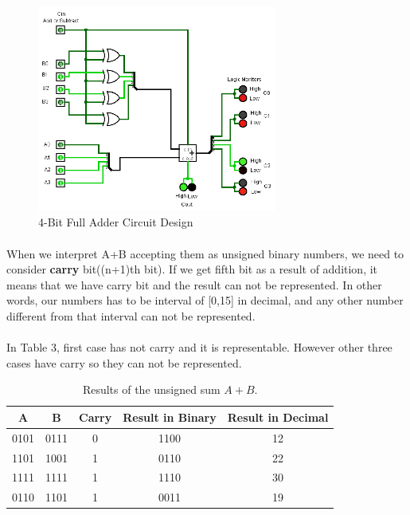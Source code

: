 \documentclass[pdftex,12pt,a4paper]{article}
\begin{document}
\begin{figure}[!h]
	\centering
	\includegraphics[width=0.7\textwidth]{part3.png}	
	\caption{4-Bit Full Adder Circuit Design}
	\label{4-Bit Full Adder}
\end{figure}
\clearpage
\paragraph{}
When we interpret A+B accepting them as unsigned binary numbers, we need to consider \textbf{carry} bit((n+1)th bit). If we get fifth bit as a result of addition, it means that we have carry bit and the result can not be represented. In other words, our numbers has to be interval of [0,15] in decimal, and any other number different from that interval can not be represented.
\paragraph{}
In Table 3, first case has not carry and it is representable. However other three cases have carry so they can not be represented. \newline
\begin{table}[!h]
\begin{center}
    \begin{tabular}{|c|c|c|c|c|}
    \hline
         A & B & Carry & Result in Binary & Result in Decimal \\
         \hline
         0101 & 0111 & 0 & 1100 & 12 \\
         \hline
         1101 & 1001 & 1 & 0110 & 22  \\
         \hline
         1111 & 1111 & 1 & 1110 & 30 \\
         \hline
         0110 & 1101 & 1 & 0011 & 19 \\
         \hline
        \end{tabular}
    \caption{Results of the unsigned sum $A + B$.}
    \label{unsigned_sum}
\end{center}
\end{table}
\end{document}
